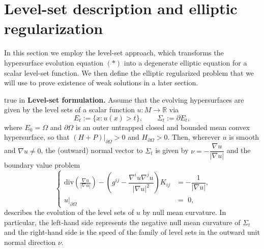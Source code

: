 \documentclass[11pt]{amsart}
\begin{document}
\section{Level-set description and elliptic regularization}
In this section we employ the level-set approach, which transforms the hypersurface evolution equation $(*)$ into a degenerate elliptic equation for a scalar level-set function. We then define the elliptic regularized problem that we will use to prove existence of weak solutions in a later section.

 true in
\textbf{Level-set formulation.}
Assume that the evolving hypersurfaces are given by the level sets of a scalar function $u:M\to\mathbb{R}$ via 
\begin{equation*}
E_t:=\{x:u(x)>t\},\quad\quad\Sigma_t:=\partial E_t,
\end{equation*}
where $E_0=\Omega$ and $\partial \Omega$ is an outer untrapped closed and bounded mean convex hypersurface, so that $(H+P)|_{\partial \Omega}>0$ and $H_{\partial \Omega}>0$. Then, wherever $u$ is smooth and $\nabla u\neq0$, the (outward) normal vector to $\Sigma_t$ is given by $\nu=-\dfrac{\nabla u}{|\nabla u|}$ and the boundary value problem
\[\tag{$**$} \,\,
\left\lbrace
\begin{aligned}
 \mbox{div}\left( \frac{\nabla u}{|\nabla u|}\right)-\left(g^{ij}-\dfrac{\nabla^iu\nabla^ju}{|\nabla u|^2}\right)K_{ij} &=-\dfrac{1}{ |\nabla u|} , \\
           u\Big|_{\partial \Omega} \,\, &= \,\, 0,
\end{aligned}
\right.
\]
describes the evolution of the level sets of $u$ by null mean curvature. In particular, the left-hand side represents the negative null mean curvature of $\Sigma_t$ and the right-hand side is the speed of the family of level sets in the outward unit normal direction $\nu$.  
\end{document}
